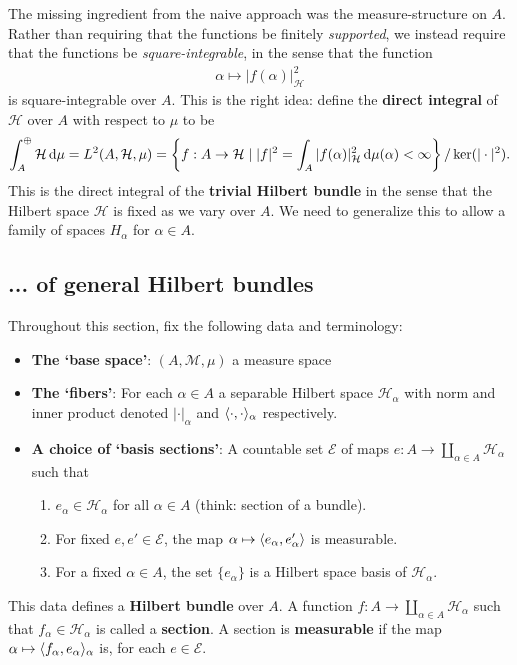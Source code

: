 \documentclass[11pt]{amsart}
\newcommand{\M}{\mathcal{M}}
\newcommand{\hsp}{\hspace{1mm}}
\newcommand{\E}{\mathcal{E}}
\renewcommand{\H}{\mathcal{H}}
\newcommand{\set}[2]{\left\{ #1 \hsp| \hsp #2\right\}}
\begin{document}
\par The missing ingredient from the naive approach was the measure-structure on $A$.  Rather than requiring that the functions be finitely \emph{supported}, we instead require that the functions be \emph{square-integrable}, in the sense that the function 
	\begin{align*}
		\alpha \mapsto |f(\alpha)|^{2}_{\H} 
	\end{align*}
is square-integrable over $A$. This is the right idea: define the {\bf direct integral} of $\H$ over $A$ with respect to $\mu$ to be 
	\begin{align*}
		\int^{\oplus}_{A}\H \dop \mu=L^{2}(A,\H,\mu)=\set{f:A \to \H}{|f|^{2}=\int_{A} |f(\alpha)|^{2}_{\H}\dop \mu(\alpha)<\infty} / \ker(|\cdot|^{2}).
	\end{align*}
This is the direct integral of the {\bf trivial Hilbert bundle} in the sense that the Hilbert space $\H$ is fixed as we vary over $A$. We need to generalize this to allow a family of spaces $H_{\alpha}$ for $\alpha \in A$.
\subsection{... of general Hilbert bundles}
Throughout this section, fix the following data and terminology:
	\begin{itemize}
		\item {\bf The `base space'}: $(A,\M, \mu)$ a measure space 
		\item {\bf The `fibers'}: For each $\alpha\in A$ a separable Hilbert space $\H_{\alpha}$ with norm and inner product denoted $|\cdot|_{\alpha}$ and $\langle \cdot, \cdot \rangle_{\alpha}$ respectively.
		\item {\bf A choice of `basis sections'}: A countable set $\E$ of maps $e:A \to \coprod_{\alpha\in A} \H_{\alpha}$ such that 
			\begin{enumerate}
				\item  $e_{\alpha} \in \H_{\alpha}$ for all $\alpha \in A$ (think: section of a bundle).
				\item For fixed $e,e'\in \E$, the map $\alpha \mapsto \langle e_{\alpha}, e'_{\alpha} \rangle$ is measurable. 
				\item For a fixed $\alpha \in A$, the set $\{e_{\alpha}\}$ is a Hilbert space basis of $\H_{\alpha}$.
			\end{enumerate}
	\end{itemize}
This data defines a {\bf Hilbert bundle} over $A$.  A function $f:A\to \coprod_{\alpha \in A}\H_{\alpha}$ such that $f_{\alpha} \in \H_{\alpha}$ is called a {\bf section}. A section is {\bf measurable} if the map $\alpha \mapsto \langle f_{\alpha}, e_{\alpha} \rangle_{\alpha}$ is, for each $e \in \E$. 
\end{document}
